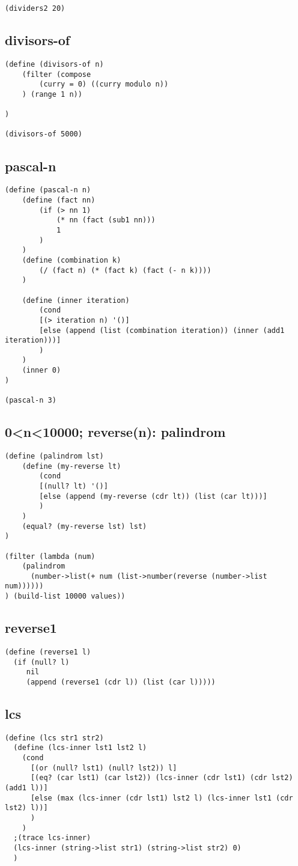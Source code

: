 \begin{multicols}{2}[]
\begin{lstlisting}
(dividers2 20)
\end{lstlisting}
\subsection{divisors-of}
\begin{lstlisting}
(define (divisors-of n)
    (filter (compose
        (curry = 0) ((curry modulo n))
    ) (range 1 n))

)

(divisors-of 5000)
\end{lstlisting}
\newpage
\subsection{pascal-n}
\begin{lstlisting}
(define (pascal-n n)
    (define (fact nn)
        (if (> nn 1)
            (* nn (fact (sub1 nn)))
            1
        )
    )
    (define (combination k)
        (/ (fact n) (* (fact k) (fact (- n k))))
    )

    (define (inner iteration)
        (cond
        [(> iteration n) '()]
        [else (append (list (combination iteration)) (inner (add1 iteration)))]
        )
    )
    (inner 0)
)

(pascal-n 3)
\end{lstlisting}
\subsection{0<n<10000; reverse(n): palindrom}
\begin{lstlisting}
(define (palindrom lst)
    (define (my-reverse lt)
        (cond
        [(null? lt) '()]
        [else (append (my-reverse (cdr lt)) (list (car lt)))]
        )
    )
    (equal? (my-reverse lst) lst)
)

(filter (lambda (num)
    (palindrom
      (number->list(+ num (list->number(reverse (number->list num))))))
) (build-list 10000 values))
\end{lstlisting}
\subsection{reverse1}
\begin{lstlisting}
(define (reverse1 l)
  (if (null? l)
     nil
     (append (reverse1 (cdr l)) (list (car l)))))
\end{lstlisting}
\subsection{lcs}
\begin{lstlisting}
(define (lcs str1 str2)
  (define (lcs-inner lst1 lst2 l)
    (cond
      [(or (null? lst1) (null? lst2)) l]
      [(eq? (car lst1) (car lst2)) (lcs-inner (cdr lst1) (cdr lst2) (add1 l))]
      [else (max (lcs-inner (cdr lst1) lst2 l) (lcs-inner lst1 (cdr lst2) l))]
      )
    )
  ;(trace lcs-inner)
  (lcs-inner (string->list str1) (string->list str2) 0)
  )
\end{lstlisting}

\end{multicols}
